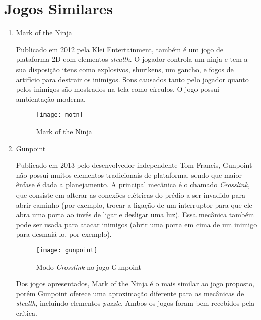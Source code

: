 \AddToShipoutPicture{\BackgroundPic}

\section*{Jogos Similares}

\begin{enumerate}
	\item {\Large Mark of the Ninja}
	
	Publicado em 2012 pela Klei Entertainment, também é um jogo de plataforma 2D com elementos \emph{stealth}. O jogador controla um ninja e tem a sua disposição itens como explosivos, shurikens, um gancho, e fogos de artifício para destrair os inimigos. Sons causados tanto pelo jogador quanto pelos inimigos são mostrados na tela como círculos. O jogo possui ambientação moderna. 

	\begin{figure}[htb]
		\centering
		\texttt{[image: motn]}
		\caption{Mark of the Ninja}
	\end{figure}

	\item {\Large Gunpoint}
	
	Publicado em 2013 pelo desenvolvedor independente Tom Francis, Gunpoint não possui muitos elementos tradicionais de plataforma, sendo que maior ênfase é dada a planejamento. A principal mecânica é o chamado \emph{Crosslink}, que consiste em alterar as conexões elétricas do prédio a ser invadido para abrir caminho (por exemplo, trocar a ligação de um interruptor para que ele abra uma porta ao invés de ligar e desligar uma luz). Essa mecânica também pode ser usada para atacar inimigos (abrir uma porta em cima de um inimigo para desmaiá-lo, por exemplo).

	\begin{figure}[h]
		\centering
		\texttt{[image: gunpoint]}
		\caption{Modo \emph{Crosslink} no jogo Gunpoint}
	\end{figure}

	Dos jogos apresentados, Mark of the Ninja é o mais similar ao jogo proposto, porém Gunpoint oferece uma aproximação diferente para as mecânicas de \emph{stealth}, incluindo elementos \emph{puzzle}. Ambos os jogos foram bem recebidos pela crítica.
	
\end{enumerate}
